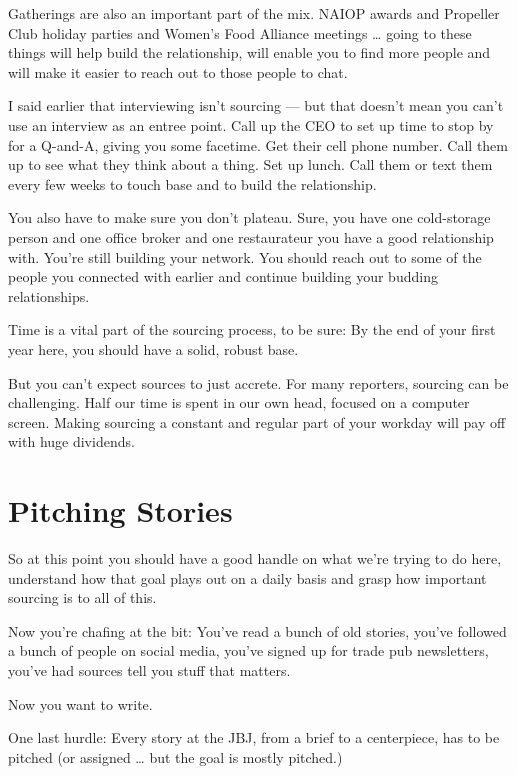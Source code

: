 \documentclass[
  12pt,
  american,
  letterpaperpaper,
  extrafontsizes,onecolumn,openright
  ]{memoir}
\begin{document}
Gatherings are also an important part of the mix. NAIOP awards and Propeller Club holiday parties and Women's Food Alliance meetings \ldots{} going to these things will help build the relationship, will enable you to find more people and will make it easier to reach out to those people to chat.

I said earlier that interviewing isn't sourcing --- but that doesn't mean you can't use an interview as an entree point. Call up the CEO to set up time to stop by for a Q-and-A, giving you some facetime. Get their cell phone number. Call them up to see what they think about a thing. Set up lunch. Call them or text them every few weeks to touch base and to build the relationship.

You also have to make sure you don't plateau. Sure, you have one cold-storage person and one office broker and one restaurateur you have a good relationship with. You're still building your network. You should reach out to some of the people you connected with earlier and continue building your budding relationships.

Time is a vital part of the sourcing process, to be sure: By the end of your first year here, you should have a solid, robust base.

But you can't expect sources to just accrete. For many reporters, sourcing can be challenging. Half our time is spent in our own head, focused on a computer screen. Making sourcing a constant and regular part of your workday will pay off with huge dividends.

\hypertarget{pitching-stories}{%
\chapter{Pitching Stories}\label{pitching-stories}}

So at this point you should have a good handle on what we're trying to do here, understand how that goal plays out on a daily basis and grasp how important sourcing is to all of this.

Now you're chafing at the bit: You've read a bunch of old stories, you've followed a bunch of people on social media, you've signed up for trade pub newsletters, you've had sources tell you stuff that matters.

Now you want to write.

One last hurdle: Every story at the JBJ, from a brief to a centerpiece, has to be pitched (or assigned \ldots{} but the goal is mostly pitched.)
\end{document}
